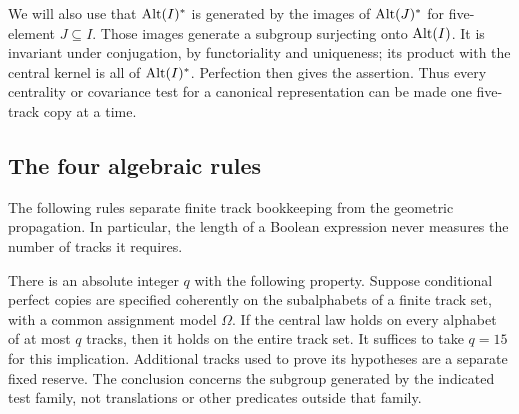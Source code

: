 We will also use that $\operatorname{Alt}(I)^\ast$ is generated by the images
of $\operatorname{Alt}(J)^\ast$ for five-element $J\subseteq I$.  Those images
generate a subgroup surjecting onto $\operatorname{Alt}(I)$.  It is invariant
under conjugation, by functoriality and uniqueness; its product
with the central kernel is all of $\operatorname{Alt}(I)^\ast$.  Perfection
then gives the assertion.  Thus every centrality or covariance
test for a canonical representation can be made one five-track
copy at a time.

\subsection{The four algebraic rules}

The following rules separate finite track bookkeeping from the
geometric propagation.  In particular, the length of a Boolean
expression never measures the number of tracks it requires.

\begin{lemma}\label{lem:small-support}
There is an absolute integer $q$ with the following property.
Suppose conditional perfect copies are specified coherently on
the subalphabets of a finite track set, with a common assignment
model $\Omega$.  If the central law holds on every alphabet of
at most $q$ tracks, then it holds on the entire track set.
It suffices to take $q=15$ for this implication.  Additional
tracks used to prove its hypotheses are a separate fixed reserve.
The conclusion concerns the subgroup generated by the indicated
test family, not translations or other predicates outside that
family.
\end{lemma}

